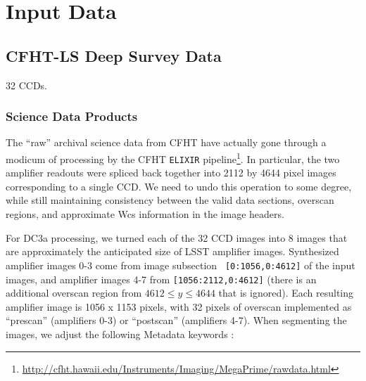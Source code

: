 
\section{Input Data}


\subsection{CFHT-LS Deep Survey Data}

32 CCDs.

\subsubsection{Science Data Products}

The ``raw'' archival science data from CFHT have actually gone through
a modicum of processing by the CFHT {\tt ELIXIR}
pipeline\footnote{\url{http://cfht.hawaii.edu/Instruments/Imaging/MegaPrime/rawdata.html}}.
In particular, the two amplifier readouts were spliced back together
into 2112 by 4644 pixel images corresponding to a single CCD.  We need
to undo this operation to some degree, while still maintaining
consistency between the valid data sections, overscan regions, and
approximate Wcs information in the image headers.

For DC3a processing, we turned each of the 32 CCD images into 8 images
that are approximately the anticipated size of LSST amplifier images.
Synthesized amplifier images 0-3 come from image subsection {\tt
[0:1056,0:4612]} of the input images, and amplifier images 4-7 from
{\tt [1056:2112,0:4612]} (there is an additional overscan region from
$4612 \leq y \leq 4644$ that is ignored).  Each resulting amplifier
image is 1056 x 1153 pixels, with 32 pixels of overscan implemented as
``prescan'' (amplifiers 0-3) or ``postscan'' (amplifiers 4-7).  When
segmenting the images, we adjust the following Metadata keywords :


